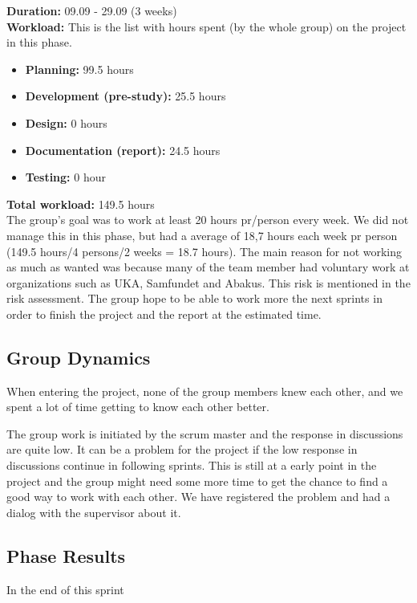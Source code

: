 		{\bf Duration:} 09.09 - 29.09 (3 weeks)\\
		{\bf Workload:} This is the list with hours spent (by the whole group) on the project in this phase.
			\begin{itemize}
				\item {\bf Planning:} 99.5 hours
				\item {\bf Development (pre-study):} 25.5 hours
				\item {\bf Design:} 0 hours
				\item {\bf Documentation (report):} 24.5 hours
				\item {\bf Testing:} 0 hour
			\end{itemize}
		{\bf Total workload: } 149.5 hours \\
	The group's goal was to work at least 20 hours pr/person every week. We did not manage this in this phase, but had a average of 18,7 hours each week pr person (149.5 hours/4 persons/2 weeks = 18.7 hours). 
	The main reason for not working as much as wanted was because many of the team member had voluntary
	work at organizations such as UKA, Samfundet and Abakus. This risk is mentioned in the risk assessment. The group 
	hope to be able to work more the next sprints in order to finish the project and the report at the estimated
	time. 

\subsection{Group Dynamics}
	When entering the project, none of the group members knew each other, and we spent a lot
	of time getting to know each other better.

	The group work is initiated by the scrum master and the response in discussions are quite low.
	It can be a problem for the project if the low response in discussions 
	continue in following sprints. This is still at a early point in the project and the group might need
	some more time to get the chance to find a good way to work with each other. 
	We have registered the problem and had a dialog with the supervisor about it. 

\subsection{Phase Results}
	In the end of this sprint
